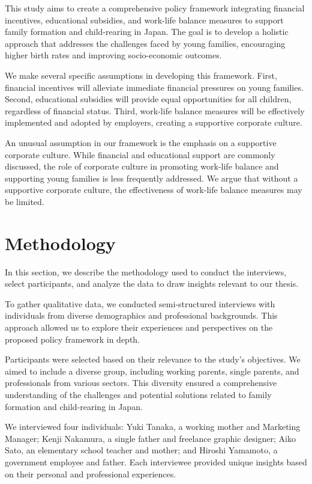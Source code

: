 \documentclass{article} %
\begin{document}
This study aims to create a comprehensive policy framework integrating financial incentives, educational subsidies, and work-life balance measures to support family formation and child-rearing in Japan. The goal is to develop a holistic approach that addresses the challenges faced by young families, encouraging higher birth rates and improving socio-economic outcomes.

We make several specific assumptions in developing this framework. First, financial incentives will alleviate immediate financial pressures on young families. Second, educational subsidies will provide equal opportunities for all children, regardless of financial status. Third, work-life balance measures will be effectively implemented and adopted by employers, creating a supportive corporate culture.

An unusual assumption in our framework is the emphasis on a supportive corporate culture. While financial and educational support are commonly discussed, the role of corporate culture in promoting work-life balance and supporting young families is less frequently addressed. We argue that without a supportive corporate culture, the effectiveness of work-life balance measures may be limited.

\section{Methodology}
\label{sec:method}

In this section, we describe the methodology used to conduct the interviews, select participants, and analyze the data to draw insights relevant to our thesis.

To gather qualitative data, we conducted semi-structured interviews with individuals from diverse demographics and professional backgrounds. This approach allowed us to explore their experiences and perspectives on the proposed policy framework in depth.

Participants were selected based on their relevance to the study's objectives. We aimed to include a diverse group, including working parents, single parents, and professionals from various sectors. This diversity ensured a comprehensive understanding of the challenges and potential solutions related to family formation and child-rearing in Japan.

We interviewed four individuals: Yuki Tanaka, a working mother and Marketing Manager; Kenji Nakamura, a single father and freelance graphic designer; Aiko Sato, an elementary school teacher and mother; and Hiroshi Yamamoto, a government employee and father. Each interviewee provided unique insights based on their personal and professional experiences.
\end{document}
